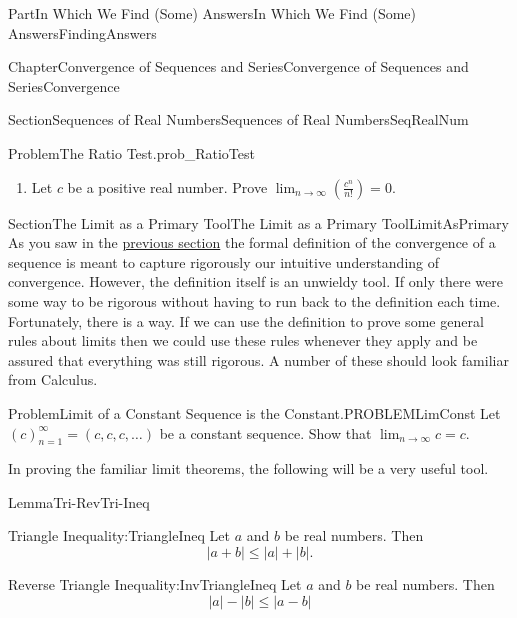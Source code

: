 \documentclass[oneside,10pt,]{book}
\numberwithin{equation}{part}
\newcommand{\abs}[1]{\left|#1\right|}
\def\limit#1#2#3{{\displaystyle\lim_{#1\rightarrow #2}#3}}
\def\limitt#1#2#3{{\displaystyle\lim_{#1\rightarrow #2}\textstyle #3}}
\begin{document}
\begin{partptx}{Part}{In Which We Find (Some) Answers}{}{In Which We Find (Some) Answers}{}{}{FindingAnswers}
\begin{chapterptx}{Chapter}{Convergence of Sequences and Series}{}{Convergence of Sequences and Series}{}{}{Convergence}
\begin{sectionptx}{Section}{Sequences of Real Numbers}{}{Sequences of Real Numbers}{}{}{SeqRealNum}
\begin{problem}{Problem}{The Ratio Test.}{prob_RatioTest}
\begin{enumerate}[font=\bfseries,label=(\alph*),ref=\alph*]
\item{}Let \(c\) be a positive real number.  Prove \(\limit{n}{\infty}{\left(\frac{c^n}{n!}\right)}=0\).%
\end{enumerate}%
\end{problem}
\end{sectionptx}
%
%
\typeout{************************************************}
\typeout{************************************************}
%
\begin{sectionptx}{Section}{The Limit as a Primary Tool}{}{The Limit as a Primary Tool}{}{}{LimitAsPrimary}
As you saw in the \hyperref[SeqRealNum]{previous section} the formal definition of the convergence of a sequence is meant to capture rigorously our intuitive understanding of convergence.  However, the definition itself is an unwieldy tool. If only there were some way to be rigorous without having to run back to the definition each time.  Fortunately, there is a way.  If we can use the definition to prove some general rules about limits then we could use these rules whenever they apply and be assured that everything was still rigorous.  A number of these should look familiar from Calculus.%
\begin{problem}{Problem}{Limit of a Constant Sequence is the Constant.}{PROBLEMLimConst}%
Let \(\left(c\right)_{n=1}^\infty=(c,c,c,\ldots)\) be a constant sequence.  Show that \(\limitt{n}{\infty}{c}=c\).%
\end{problem}
In proving the familiar limit theorems, the following will be a very useful tool.%
\begin{lemma}{Lemma}{}{}{Tri-RevTri-Ineq}%
%
%
%
%
\begin{descriptionlist}
\begin{dlimedium}{Triangle Inequality:}{TriangleIneq}%
Let \(a\) and \(b\) be real numbers. Then%
\begin{equation*}
\abs{a+b}\leq \abs{a}+\abs{b}\text{.}
\end{equation*}
%
\end{dlimedium}%
\begin{dlimedium}{Reverse Triangle Inequality:}{InvTriangleIneq}%
Let \(a\) and \(b\) be real numbers. Then%
\begin{equation*}
\abs{a}-\abs{b}\leq\abs{a-b}
\end{equation*}
%
\end{dlimedium}%

\end{descriptionlist}
\end{lemma}
\end{sectionptx}
\end{chapterptx}
\end{partptx}
\end{document}
